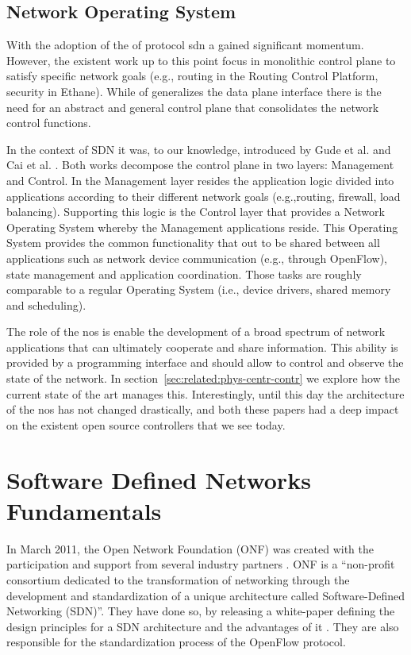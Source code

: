 \subsection{Network Operating System}
\glsresetall
\label{sec:related:netw-oper-syst}
With the adoption of the \gls{of} protocol \gls{sdn} a gained significant momentum. 
However, the existent work up to this point focus in monolithic control plane to satisfy specific network goals (e.g., routing in the Routing Control Platform, security in Ethane). 
While \gls{of} generalizes the data plane interface there is  the need for an abstract and general control plane that consolidates the network control functions. 

In the context of SDN it was, to our knowledge, introduced by Gude et al. \cite{Gude:2008jd} and Cai et al. \cite{Z.-Cai:2008fk}.
Both works decompose the control plane in two layers: Management and Control. 
In the Management layer resides the application logic divided into applications according to their different network goals (e.g.,routing, firewall, load balancing). 
Supporting this logic is the Control layer that provides a Network Operating System whereby the Management applications reside. 
This Operating System provides the common functionality that out to be shared between all applications such as network device communication (e.g., through OpenFlow), state management and application coordination. 
Those tasks are roughly comparable to a regular Operating System (i.e., device drivers, shared memory and scheduling). 


The role of the \gls{nos} is enable the development of a broad spectrum of network applications that can ultimately cooperate and share information. This ability is provided by a programming interface and should allow to control and observe the state of the network. 
In section~\ref{sec:related:phys-centr-contr} we explore how the current state of the art manages this. 
Interestingly, until this day the architecture of the \gls{nos} has not changed drastically, and both these papers had a deep impact on the existent open source controllers that we see today. 
\glsresetall

\section{Software Defined Networks Fundamentals}
\glsresetall
\label{sec:realted:softw-defin-netw}


In March 2011, the Open Network Foundation (ONF) was created with the participation and support from several industry partners \cite{onf}. 
ONF  is a ``non-profit consortium dedicated to the transformation of networking through the development and standardization of a unique architecture called Software-Defined Networking (SDN)''. 
They have done so, by releasing a white-paper defining the design principles for a SDN architecture and the advantages of it \cite{ONF:2012ui}. 
They are also responsible for the standardization process of the OpenFlow protocol.

